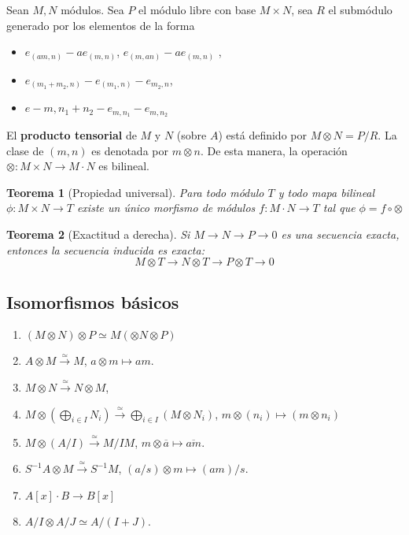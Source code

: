 \documentclass[12pt]{book}
\newtheorem{teo}{Teorema}
\begin{document}
Sean $M, N$ módulos. Sea $P$ el módulo libre con base $M\times N$, sea $R$ el submódulo generado por los elementos de la forma
\begin{itemize}
\item $ e_{(am,n)} -a e_{(m,n)} $, $ e_{(m,an)} -a e_{(m,n)} $ ,
\item $ e_{(m_1+m_2,n)} - e_{(m_1,n)} - e _{m_2, n} $,
\item $ e-{m, n_1 + n_2} - e _{m,n_1} - e _{m,n_2}$
\end{itemize}
El \textbf{producto tensorial} de $M$ y $N$ (sobre $A$) está definido por $M\otimes N = P /R$. La clase de $(m,n)$ es denotada por $m\otimes n$. De esta manera, la operación $\otimes : M\times N \rightarrow M \cdot N$ es bilineal.

\begin{teo}[Propiedad universal]
Para todo módulo $T$ y todo mapa bilineal $\phi : M\times N \rightarrow T$ existe un único morfismo de módulos $ f: M \cdot N \rightarrow T$ tal que $ \phi = f \circ \otimes $
\end{teo}

\begin{teo}[Exactitud a derecha]
Si $M\rightarrow N \rightarrow P \rightarrow 0$ es una secuencia exacta, entonces la secuencia inducida es exacta: 
$$ M \otimes T \rightarrow N  \otimes T \rightarrow P \otimes T \rightarrow 0 $$
\end{teo}


\subsection*{Isomorfismos básicos}
\begin{enumerate}
\item $(M \otimes N) \otimes P \simeq M (\otimes N \otimes P)$
\item $A \otimes M \stackrel{\simeq}{\rightarrow}  M $, $a\otimes m \mapsto am$.
\item $M \otimes N \stackrel{\simeq}{\rightarrow} N \otimes M$,
\item $ M \otimes \left( \bigoplus_{i\in I} N_i \right)\stackrel{\simeq}{\rightarrow} \bigoplus_{i\in I} (M\otimes N_i) $, $ m \otimes (n_i ) \mapsto (m\otimes n_i )$
\item $M \otimes (A/I) \stackrel{\simeq}{\rightarrow} M/ IM$, $ m \otimes \overline{a} \mapsto \overline{am}$.
\item $S^{-1} A \otimes M \stackrel{\simeq}{\rightarrow} S^{-1} M$, $(a/s ) \otimes m \mapsto (am)/ s$.
\item $A[x] \cdot B \rightarrow B[x]$
\item $A/I \otimes A/J \simeq A/(I+J)$.
\end{enumerate}
\end{document}
